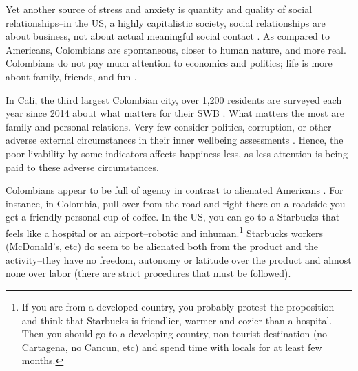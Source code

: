 \documentclass[10pt, letterpaper]{article}
\begin{document}
\begin{spacing}{2}
Yet another source of stress and anxiety is quantity and quality of social
relationships--in the US, a highly capitalistic society, social relationships are
about business, not about actual meaningful social contact
\citep{horowitzMISC10,gssLonnieRubia}.  %
As compared to %
 Americans,  Colombians are  spontaneous, %
 closer to human nature, and more real. 
Colombians do not pay much attention to economics %
and politics; life is more
about family, friends, and fun \citep{martinez17,martinez20}. 

In Cali, the third largest Colombian city, over 1,200 residents are
surveyed each year since 2014 about what matters for their SWB
\citep{martinez17,martinez20}. What matters the most are family and personal relations. Very few consider  politics, corruption, or other 
adverse external circumstances in their inner wellbeing assessments
\citep{martinez17,martinez20}. Hence, the poor livability by some indicators affects
happiness less, as less attention is being paid to these adverse circumstances. 

 Colombians appear to be  full of agency in contrast to alienated Americans \cite{scitovsky76,duany01,leonard10,chomsky09,wheelerIN15aug6}.  
For instance, in Colombia, pull over from the road and right there on a roadside you get a
friendly personal cup of coffee. In the US, you can  go to a  
Starbucks that feels like a hospital or an airport--robotic and inhuman.\footnote{If
  you are from a developed country, you probably protest the proposition and
  think that Starbucks is friendlier, warmer and cozier than a hospital. Then
  you should go to a developing country, non-tourist destination (no Cartagena,
  no Cancun, etc) and spend time with locals for at least few  months.}
 Starbucks workers (McDonald's, etc) do seem to be alienated both from the product and the activity--they
have no freedom, autonomy or latitude over the product %
and almost none over labor (there are strict procedures that must be followed). 


\end{spacing}
\end{document}

